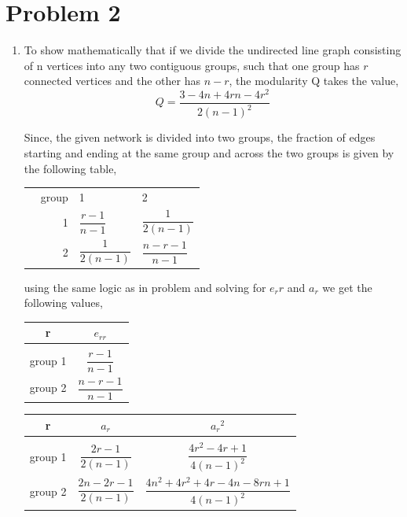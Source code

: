 \documentclass{article}
\begin{document}
\section*{Problem 2}
\begin{enumerate}[label=(\alph*)]
\item
To show mathematically that if we divide the undirected line graph consisting of n vertices  into any two contiguous groups, such that one group has $r$ connected vertices and the other has $n-r$, the modularity Q takes the value,
$$Q = \dfrac{3-4n+4rn-4r^2}{2(n-1)^2}$$

Since, the given network is divided into two groups, the fraction of edges starting and ending at the same group and across the two groups is given by the following table,

\begin{table}[h!]
\centering
\begin{tabular}{l r|l l}                      
& \multicolumn{1}{r|}{group} &1   &2  \\ \cline{2-4}
& \multicolumn{1}{r|}{1} &$\dfrac{r-1}{n-1}$   &$\dfrac{1}{2(n-1)}$      \\
& \multicolumn{1}{r|}{2} &$\dfrac{1}{2(n-1)}$   &$\dfrac{n-r-1}{n-1}$     
\end{tabular}
\end{table}

using the same logic as in problem and solving for $e_rr$ and $a_r$ we get the following values,

\begin{table}[H]
    \begin{minipage}{.4\textwidth}
    \centering
	\begin{tabular}{ |c|c| } 
	\hline
	r & $e_{rr}$ \\
	\hline
	&\\
	group 1 & $\dfrac{r-1}{n-1}$  \\
	group 2 & $\dfrac{n-r-1}{n-1}$\\
	\hline
	\end{tabular}
	\end{minipage}
    \begin{minipage}{.6\textwidth}
    \centering
	\begin{tabular}{ |c|c|c| } 
	\hline
	r & $a_{r}$ & ${a_r}^2$ \\
	\hline
	& &\\
	group 1 & $\dfrac{2r-1}{2(n-1)}$ & $\dfrac{4r^2-4r+1}{4(n-1)^2}$\\
	group 2 & $\dfrac{2n-2r-1}{2(n-1)}$ & $\dfrac{4n^2+4r^2+4r-4n-8rn+1}{4(n-1)^2}$\\
	\hline
	\end{tabular}
	\end{minipage}
\end{table}


\end{enumerate}
\end{document}
